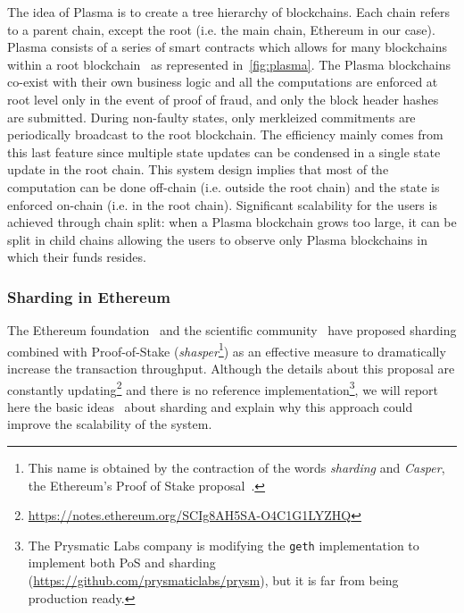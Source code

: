 The idea of Plasma is to create a tree hierarchy of blockchains. Each chain
refers to a parent chain, except the root (i.e. the main chain, Ethereum in our
case). Plasma consists of a series of smart contracts which allows for many
blockchains within a root blockchain~\cite{poon2017plasma} as represented
in~\autoref{fig:plasma}. The Plasma blockchains co-exist with their own business
logic and all the computations are enforced at root level only in the event of
proof of fraud, and only the block header hashes are submitted. During
non-faulty states, only merkleized commitments are periodically broadcast to the
root blockchain. The efficiency mainly comes from this last feature since
multiple state updates can be condensed in a single state update in the root
chain. This system design implies that most of the computation can be done
off-chain (i.e. outside the root chain) and the state is enforced on-chain (i.e.
in the root chain). Significant scalability for the users is achieved through
chain split: when a Plasma blockchain grows too large, it can be split in child
chains allowing the users to observe only Plasma blockchains in which their
funds resides.

\subsubsection{Sharding in Ethereum}
The Ethereum foundation~\cite{bib:mauve, bib:sharding-faq} and the scientific
community~\cite{bib:scaling-croman} have proposed sharding combined with
Proof-of-Stake (\emph{shasper}\footnote{This name is obtained by the contraction
of the words \emph{sharding} and \emph{Casper}, the Ethereum's Proof of Stake
proposal~\cite{bib:cbc-casper}.}) as an effective measure to dramatically
increase the transaction throughput. Although the details about this proposal
are constantly
updating\footnote{\url{https://notes.ethereum.org/SCIg8AH5SA-O4C1G1LYZHQ}} and
there is no reference implementation\footnote{The Prysmatic Labs company is
modifying the \texttt{geth} implementation to implement both PoS and sharding
(\url{https://github.com/prysmaticlabs/prysm}), but it is far from being
production ready.}, we will report here the basic
ideas~\cite{bib:mauve,bib:sharding-faq} about sharding and explain why this
approach could improve the scalability of the system.


